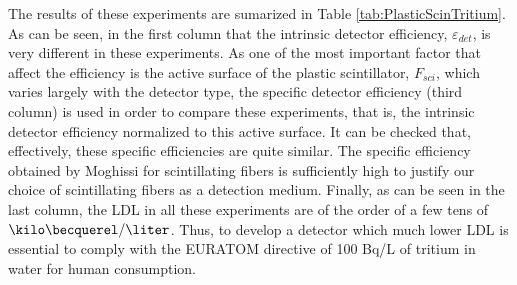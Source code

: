 
The results of these experiments are sumarized in Table \ref{tab:PlasticScinTritium}. As can be seen, in the first column that the intrinsic detector efficiency, $\varepsilon_{det}$, is very different in these experiments. As one of the most important factor that affect the efficiency is the active surface of the plastic scintillator, $F_{sci}$, which varies largely with the detector type, the specific detector efficiency (third column) is used in order to compare these experiments, that is, the intrinsic detector efficiency normalized to this active surface. It can be checked that, effectively, these specific efficiencies are quite similar. The specific efficiency obtained by Moghissi for scintillating fibers is sufficiently high to justify our choice of scintillating fibers as a detection medium. Finally, as can be seen in the last column, the LDL in all these experiments are of the order of a few tens of $\kilo\becquerel/\liter$. Thus, to develop a detector which much lower LDL is essential to comply with the EURATOM directive of 100 Bq/L of tritium in water for human consumption.